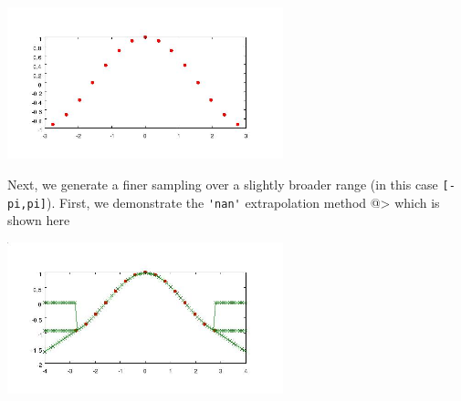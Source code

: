 \centerline{\includegraphics[width=8cm]{interplin1_1}}

Next, we generate a finer sampling over a slightly broader range
(in this case \verb|[-pi,pi]|).  First, we demonstrate the \verb|'nan'| 
extrapolation method
@>
which is shown here


\centerline{\includegraphics[width=8cm]{interplin1_2}}

